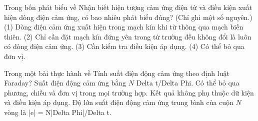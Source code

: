 \begin{ex}
Trong bốn phát biểu về Nhận biết hiện tượng cảm ứng điện từ và điều kiện xuất hiện dòng điện cảm ứng, có bao nhiêu phát biểu đúng? (Chỉ ghi một số nguyên.) (1) Dòng điện cảm ứng xuất hiện trong mạch kín khi từ thông qua mạch biến thiên. (2) Chỉ cần đặt mạch kín đứng yên trong từ trường đều không đổi là luôn có dòng điện cảm ứng. (3) Cần kiểm tra điều kiện áp dụng. (4) Có thể bỏ qua đơn vị.
\end{ex}

\begin{ex}
Trong một bài thực hành về Tính suất điện động cảm ứng theo định luật Faraday?
\choice
{Suất điện động cảm ứng bằng $N$ Delta t/Delta Phi.}
{Có thể bỏ qua phương, chiều và đơn vị trong mọi trường hợp.}
{Kết quả không phụ thuộc dữ kiện và điều kiện áp dụng.}
{\True Độ lớn suất điện động cảm ứng trung bình của cuộn $N$ vòng là |e| = N|Delta Phi|/Delta t.}
\end{ex}

